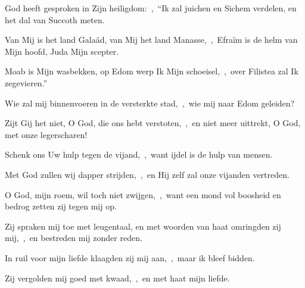 \documentclass[12pt,twoside,a5paper]{article}
\begin{document}

\begin{halfparskip}
  God heeft gesproken in Zijn heiligdom:~\sep\ ``Ik zal juichen en Sichem verdelen, en het dal van Succoth meten.

  Van Mij is het land Galaäd, van Mij het land Manasse,~\sep\ Efraïm is de helm van Mijn hoofd, Juda Mijn scepter.

  Moab is Mijn wasbekken, op Edom werp Ik Mijn schoeisel,~\sep\ over Filistea zal Ik zegevieren.''

  Wie zal mij binnenvoeren in de versterkte stad,~\sep\ wie mij naar Edom geleiden?

  Zijt Gij het niet, O God, die ons hebt verstoten,~\sep\ en niet meer uittrekt, O God, met onze legerscharen!

  Schenk ons Uw hulp tegen de vijand,~\sep\ want ijdel is de hulp van mensen.

  Met God zullen wij dapper strijden,~\sep\ en Hij zelf zal onze vijanden vertreden.
\end{halfparskip}





\begin{halfparskip}
  O God, mijn roem, wil toch niet zwijgen,~\sep\ want een mond vol boosheid en bedrog zetten zij tegen mij op.


  Zij spraken mij toe met leugentaal, en met woorden van haat omringden zij mij,~\sep\ en bestreden mij zonder reden.

  In ruil voor mijn liefde klaagden zij mij aan,~\sep\ maar ik bleef bidden.

  Zij vergolden mij goed met kwaad,~\sep\ en met haat mijn liefde.
\end{halfparskip}

\end{document}
